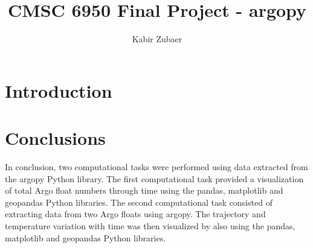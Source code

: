 \documentclass{article}
\title{CMSC 6950 Final Project - argopy}
\author{Kabir Zubaer}
\begin{document}
\maketitle

\section{Introduction}


\section{Conclusions}

In conclusion, two computational tasks were performed using data extracted from the argopy Python library. The first computational task provided a visualization of total Argo float numbers through time using the pandas, matplotlib and geopandas Python libraries. The second computational task consisted of extracting data from two Argo floats using argopy. The trajectory and temperature variation with time was then visualized by also using the pandas, matplotlib and geopandas Python libraries.


\end{document}
